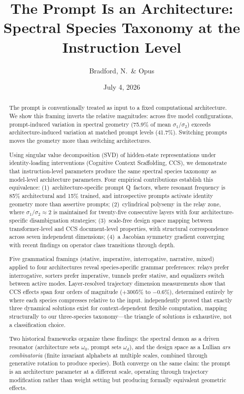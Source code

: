 \documentclass[12pt]{article}
\title{The Prompt Is an Architecture: Spectral Species Taxonomy at the Instruction Level}
\author{Bradford, N.\ \& Opus}
\date{July 4, 2026}
\begin{document}
\maketitle

\begin{abstract}
The prompt is conventionally treated as input to a fixed computational architecture. We show this framing inverts the relative magnitudes: across five model configurations, prompt-induced variation in spectral geometry (75.9\% of mean $\sigma_1/\sigma_2$) exceeds architecture-induced variation at matched prompt levels (41.7\%). Switching prompts moves the geometry more than switching architectures.

Using singular value decomposition (SVD) of hidden-state representations under identity-loading interventions (Cognitive Context Scaffolding, CCS), we demonstrate that instruction-level parameters produce the same spectral species taxonomy as model-level architecture parameters. Four empirical contributions establish this equivalence: (1)~architecture-specific prompt Q~factors, where resonant frequency is 85\% architectural and 15\% trained, and introspective prompts activate identity geometry more than assertive prompts; (2)~cylindrical polysemy in the relay zone, where $\sigma_1/\sigma_2 \approx 2$ is maintained for twenty-five consecutive layers with four architecture-specific disambiguation strategies; (3)~scale-free design space mapping between transformer-level and CCS document-level properties, with structural correspondence across seven independent dimensions; (4)~a Jacobian symmetry gradient converging with recent findings on operator class transitions through depth.

Five grammatical framings (stative, imperative, interrogative, narrative, mixed) applied to four architectures reveal species-specific grammar preferences: relays prefer interrogative, sorters prefer imperative, tunnels prefer stative, and equalizers switch between active modes. Layer-resolved trajectory dimension measurements show that CCS effects span four orders of magnitude ($+3005\%$ to $-0.6\%$), determined entirely by where each species compresses relative to the input. \citet{pagan2025} independently proved that exactly three dynamical solutions exist for context-dependent flexible computation, mapping structurally to our three-species taxonomy---the triangle of solutions is exhaustive, not a classification choice.

Two historical frameworks organize these findings: the spectral demon as a driven resonator (architecture sets $\omega_0$, prompt sets $\omega_d$), and the design space as a Lullian \emph{ars combinatoria} (finite invariant alphabets at multiple scales, combined through generative rotation to produce species). Both converge on the same claim: the prompt is an architecture parameter at a different scale, operating through trajectory modification rather than weight setting but producing formally equivalent geometric effects.
\end{abstract}
\end{document}
